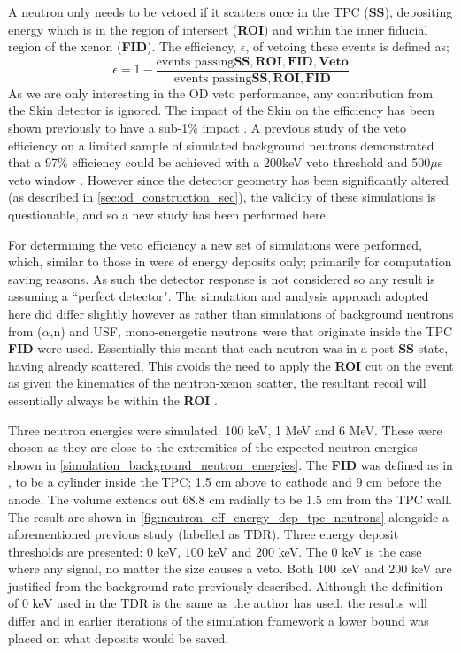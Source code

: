 \par
A neutron only needs to be vetoed if it scatters once in the TPC (\textbf{SS}), depositing energy which is in the region of intersect (\textbf{ROI}) and within the inner fiducial region of the xenon (\textbf{FID}).
The efficiency, $\epsilon$, of vetoing these events is defined as;
\begin{equation}
    \epsilon = 1 - \frac{\text{events passing}\mathbf{SS, ROI, FID, Veto}}{\text{events passing}\mathbf{SS, ROI, FID}}
    \label{eq:neutron_efficiency}
\end{equation}
As we are only interesting in the OD veto performance, any contribution from the Skin detector is ignored.
The impact of the Skin on the efficiency has been shown previously to have a sub-1\% impact \cite{sallyshaw_thesis_ref}.
A previous study of the veto efficiency on a limited sample of simulated background neutrons demonstrated that a 97\% efficiency could be achieved with a 200keV veto threshold and 500$\mu$s veto window \cite{LZ_TechnicalDesignReview_ref}.
However since the detector geometry has been significantly altered (as described in \autoref{sec:od_construction_sec}), the validity of these simulations is questionable, and so a new study has been performed here.
\par
For determining the veto efficiency a new set of simulations were performed, which, similar to those in \cite{LZ_TechnicalDesignReview_ref} were of energy deposits only; primarily for computation saving reasons.
As such the detector response is not considered so any result is assuming a ``perfect detector".
The simulation and analysis approach adopted here did differ slightly however as rather than simulations of background neutrons from ($\alpha$,n) and USF, mono-energetic neutrons were that originate inside the TPC \textbf{FID} were used.
Essentially this meant that each neutron was in a post-\textbf{SS} state, having already scattered.
This avoids the need to apply the \textbf{ROI} cut on the event as given the kinematics of the neutron-xenon scatter, the resultant recoil will essentially always be within the \textbf{ROI} \cite{xenon100_neutrons_ref}.
\par
Three neutron energies were simulated: 100 keV, 1 MeV and 6 MeV.
These were chosen as they are close to the extremities of the expected neutron energies shown in \autoref{simulation_background_neutron_energies}.
The \textbf{FID} was defined as in \cite{LZ_TechnicalDesignReview_ref}, to be a cylinder inside the TPC; 1.5 cm above to cathode and 9 cm before the anode.
The volume extends out 68.8 cm radially to be 1.5 cm from the TPC wall.
The result are shown in \autoref{fig:neutron_eff_energy_dep_tpc_neutrons} alongside a aforementioned previous study (labelled as TDR).
Three energy deposit thresholds are presented: 0 keV, 100 keV and 200 keV.
The 0 keV is the case where any signal, no matter the size causes a veto.
Both 100 keV and 200 keV are justified from the background rate previously described.
Although the definition of 0 keV used in the TDR is the same as the author has used, the results will differ and in earlier iterations of the simulation framework a lower bound was placed on what deposits would be saved.

